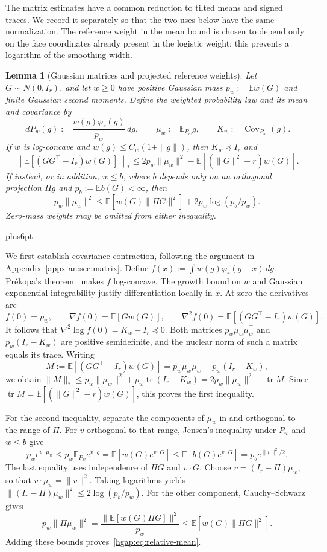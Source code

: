 \documentclass[11pt,letterpaper,twoside,leqno]{article}
\makeatletter
\theoremstyle{bookplain}
\newtheorem{lemma}{Lemma}
\theoremstyle{bookremark}
\renewenvironment{proof}[1][\proofname]{\par
  \pushQED{\qed}\normalfont\topsep6pt plus6pt\relax
  \trivlist\item[\hskip\labelsep\bfseries #1\@addpunct{.}]\ignorespaces
}{\popQED\endtrivlist\@endpefalse}
\newcommand{\E}{\mathbb E}
\newcommand{\Cov}{\operatorname{Cov}}
\newcommand{\tr}{\operatorname{tr}}
\newcommand{\dd}{\,d}
\makeatother
\begin{document}
The matrix estimates have a common reduction to tilted means and
signed traces. We record it separately so that the two uses below
have the same normalization. The reference weight in the mean bound
is chosen to depend only on the face coordinates already present in
the logistic weight; this prevents a logarithm of the smoothing width.

\begin{lemma}[Gaussian matrices and projected reference weights]
\label{hgap:lem:gaussian}
Let $G\sim N(0,I_r)$, and let $w\ge0$ have positive Gaussian mass
$p_w:=\E w(G)$ and finite Gaussian second moments. Define the weighted
probability law and its mean and covariance by
\[
 \dd P_w(g):=\frac{w(g)\varphi_r(g)}{p_w}\dd g,
 \qquad \mu_w:=\E_{P_w}g,\qquad K_w:=\Cov_{P_w}(g).
\]
If $w$ is log-concave and $w(g)\le C_w(1+\|g\|)$, then
$K_w\preceq I_r$ and
\begin{equation}\label{hgap:eq:matrix-reduction}
 \left\|\E[(GG^\top-I_r)w(G)]\right\|_*
 \le 2p_w\|\mu_w\|^2-\E[(\|G\|^2-r)w(G)].
\end{equation}
If instead, or in addition, $w\le b$, where $b$ depends only on an
orthogonal projection $\Pi g$ and $p_b:=\E b(G)<\infty$, then
\begin{equation}\label{hgap:eq:relative-mean}
 p_w\|\mu_w\|^2
 \le\E[w(G)\|\Pi G\|^2]+2p_w\log(p_b/p_w).
\end{equation}
Zero-mass weights may be omitted from either inequality.
\end{lemma}

\begin{proof}
We first establish covariance contraction, following the argument in
Appendix~\ref{appx-an:sec:matrix}. Define
$f(x):=\int w(g)\varphi_r(g-x)\dd g$.
Pr\'ekopa's theorem~\cite{Prekopa1973} makes $f$ log-concave.
The growth bound on $w$ and Gaussian exponential integrability justify
differentiation locally in $x$. At zero the derivatives are
\[
 f(0)=p_w,\qquad \nabla f(0)=\E[Gw(G)],\qquad
 \nabla^2 f(0)=\E[(GG^\top-I_r)w(G)].
\]
It follows that $\nabla^2\log f(0)=K_w-I_r\preceq0$.
Both matrices $p_w\mu_w\mu_w^\top$ and $p_w(I_r-K_w)$ are positive
semidefinite, and the nuclear norm of such a matrix equals its trace.
Writing
\[
 M:=\E[(GG^\top-I_r)w(G)]
       =p_w\mu_w\mu_w^\top-p_w(I_r-K_w),
\]
we obtain
$\|M\|_*\le p_w\|\mu_w\|^2+p_w\tr(I_r-K_w)
=2p_w\|\mu_w\|^2-\tr M$.
Since $\tr M=\E[(\|G\|^2-r)w(G)]$, this proves the first inequality.

For the second inequality, separate the components of $\mu_w$ in
and orthogonal to the range of $\Pi$. For $v$ orthogonal to that range,
Jensen's inequality under $P_w$ and $w\le b$ give
\[
 p_we^{v\cdot\mu_w}
 \le p_w\E_{P_w}e^{v\cdot g}
 =\E[w(G)e^{v\cdot G}]
 \le\E[b(G)e^{v\cdot G}]
 =p_be^{\|v\|^2/2}.
\]
The last equality uses independence of $\Pi G$ and $v\cdot G$.
Choose $v=(I_r-\Pi)\mu_w$, so that $v\cdot\mu_w=\|v\|^2$.
Taking logarithms yields
$\|(I_r-\Pi)\mu_w\|^2\le2\log(p_b/p_w)$.
For the other component, Cauchy--Schwarz gives
\[
 p_w\|\Pi\mu_w\|^2
 =\frac{\|\E[w(G)\Pi G]\|^2}{p_w}
 \le\E[w(G)\|\Pi G\|^2].
\]
Adding these bounds proves~\eqref{hgap:eq:relative-mean}.
\end{proof}
\end{document}
